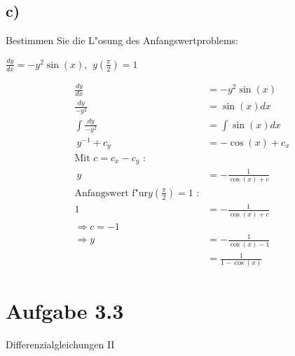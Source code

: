 \documentclass{theozettel}
\begin{document}
\subsection*{c)} Bestimmen Sie die L"osung des Anfangswertproblems:
\begin{center}
$\frac{dy}{dx} = -y^2 \sin\left(x\right)$,  $ \ y\left(\frac{\pi}{2}\right)=1$
\end{center}
\begin{align*}
\frac{dy}{dx} &= -y^2 \sin\left(x\right)\\
\frac{dy}{-y^2} &= \sin\left(x\right) dx\\
\int \frac{dy}{-y^2} &= \int \sin\left(x\right) dx\\
\ y^{-1} +c_y&= -\cos\left(x\right)+c_x\\
\text{Mit }c=c_x-c_y \text{ :}\\
\ y &= -\frac{1}{\cos\left(x\right)+c}\\
\text{Anfangswert f"ur}y\left(\frac{\pi}{2}\right)=1 \text{ :}\\
1&=-\frac{1}{\cos\left(x\right)+c}\\
\Rightarrow c=-1\\
\Rightarrow y&=-\frac{1}{\cos\left(x\right)-1}\\
&=\frac{1}{1-\cos\left(x\right)}
\end{align*}
\newpage
\section*{Aufgabe 3.3}Differenzialgleichungen II\\


\newpage
\end{document}
